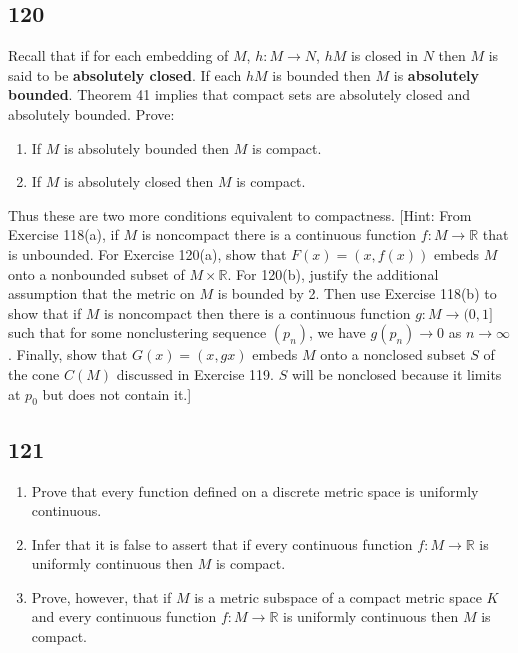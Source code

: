 \documentclass{amsart}
\begin{document}
\subsection*{120}
Recall that if for each embedding of $M$, $h : M \to N$, $hM$ is closed in $N$ then $M$ is said to be \textbf{absolutely closed}. If each $hM$ is bounded then $M$ is \textbf{absolutely bounded}. Theorem 41 implies that compact sets are absolutely closed and absolutely bounded. Prove:
\begin{enumerate}[label=(\alph*)]
\item If $M$ is absolutely bounded then $M$ is compact.
\item[*(b)] If $M$ is absolutely closed then $M$ is compact.
\end{enumerate}
Thus these are two more conditions equivalent to compactness. [Hint: From Exercise 118(a), if $M$ is noncompact there is a continuous function $f : M \to \mathbb{R}$ that is unbounded. For Exercise 120(a), show that $F(x) = (x,f(x))$ embeds $M$ onto a nonbounded subset of $M \times \mathbb{R}$. For 120(b), justify the additional assumption that the metric on $M$ is bounded by 2. Then use Exercise 118(b) to show that if $M$ is noncompact then there is a continuous function $g : M \to (0,1]$ such that for some nonclustering sequence $(p_n)$, we have $g(p_n) \to 0$ as $n \to \infty$. Finally, show that $G(x) = (x,gx)$ embeds $M$ onto a nonclosed subset $S$ of the cone $C(M)$ discussed in Exercise 119. $S$ will be nonclosed because it limits at $p_0$ but does not contain it.]

\subsection*{121}
\begin{enumerate}[label=(\alph*)]
\item Prove that every function defined on a discrete metric space is uniformly continuous.
\item Infer that it is false to assert that if every continuous function $f : M \to \mathbb{R}$ is uniformly continuous then $M$ is compact.
\item Prove, however, that if $M$ is a metric subspace of a compact metric space $K$ and every continuous function $f : M \to \mathbb{R}$ is uniformly continuous then $M$ is compact.
\end{enumerate}
\end{document}
